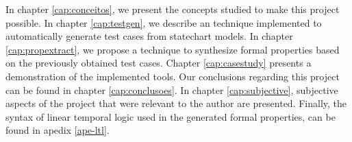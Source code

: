 In chapter \ref{cap:conceitos}, we present the concepts studied to make this project possible. In chapter \ref{cap:testgen}, we describe an technique implemented to automatically generate test cases from statechart models. In chapter \ref{cap:propextract}, we propose a technique to synthesize formal properties based on the previously obtained test cases. Chapter \ref{cap:casestudy} presents a demonstration of the implemented tools. Our conclusions regarding this project can be found in chapter \ref{cap:conclusoes}. In chapter \ref{cap:subjective}, subjective aspects of the project that were relevant to the author are presented. Finally, the syntax of linear temporal logic used in the generated formal properties, can be found in apedix \ref{ape-ltl}.
